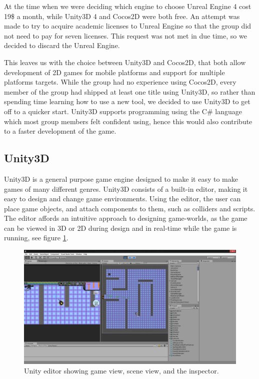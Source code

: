 At the time when we were deciding which engine to choose Unreal Engine 4 cost 19\$ a month\cite{unrealFree}, while Unity3D 4 and Cocos2D were both free. 
An attempt was made to try to acquire academic licenses to Unreal Engine so that the group did not need to pay for seven licenses. 
This request was not met in due time, so we decided to discard the Unreal Engine.

This leaves us with the choice between Unity3D and Cocos2D, that both allow development of 2D games for mobile platforms and support for multiple platforms targets.
While the group had no experience using Cocos2D, every member of the group had shipped at least one title using Unity3D, so rather than spending time learning how to use a new tool, we decided to use Unity3D to get off to a quicker start.
Unity3D supports programming using the C\# language which most group members felt confident using, hence this would also contribute to a faster development of the game.

\subsection{Unity3D}
Unity3D is a general purpose game engine designed to make it easy to make games
of many different genres. Unity3D consists of a built-in editor, making it
easy to design and change game environments. Using the editor, the user can
place game objects, and attach components to them, such as colliders and
scripts. The editor affords an intuitive approach to designing game-worlds, as
the game can be viewed in 3D or 2D during design and in real-time while the
game is running, see figure \ref{platform:editor}.

\begin{figure}[H]
\begin{center}
	\includegraphics[width=\textwidth]{figures/architecture/editor.png}
	\caption{Unity editor showing game view, scene view, and the inspector.}
	\label{platform:editor}
\end{center}
\end{figure}


